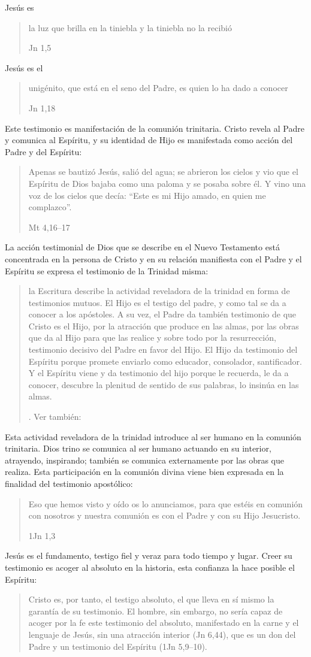Jesús es \blockquote[Jn 1,5]{la luz que brilla en la tiniebla y la tiniebla no la recibió}. Jesús es el \blockquote[Jn 1,18]{unigénito, que está en el seno del Padre, es quien lo ha dado a conocer}. Este testimonio es manifestación de la comunión trinitaria. Cristo revela al Padre y comunica al Espíritu, y su identidad de Hijo es manifestada como acción del Padre y del Espíritu: \blockquote[Mt 4,16--17]{Apenas se bautizó Jesús, salió del agua; se abrieron los cielos y vio que el Espíritu de Dios bajaba como una paloma y se posaba sobre él. Y vino una voz de los cielos que decía: \enquote{Este es mi Hijo amado, en quien me complazco}.}

La acción testimonial de Dios que se describe en el Nuevo Testamento está concentrada en la persona de Cristo y en su relación manifiesta con el Padre y el Espíritu se expresa el testimonio de la Trinidad misma: \blockquote[{\cite[410]{latourelle1999rev}}. Ver también: {\cite[131]{prades2015testimonio}}]{la Escritura describe la actividad reveladora de la trinidad en forma de testimonios mutuos. El Hijo es el testigo del padre, y como tal se da a conocer a los apóstoles. A su vez, el Padre da también testimonio de que Cristo es el Hijo, por la atracción que produce en las almas, por las obras que da al Hijo para que las realice y sobre todo por la resurrección, testimonio decisivo del Padre en favor del Hijo. El Hijo da testimonio del Espíritu porque promete enviarlo como educador, consolador, santificador. Y el Espíritu viene y da testimonio del hijo porque le recuerda, le da a conocer, descubre la plenitud de sentido de sus palabras, lo insinúa en las almas.} Esta actividad reveladora de la trinidad introduce al ser humano en la comunión trinitaria. Dios trino se comunica al ser humano actuando en su interior, atrayendo, inspirando; también se comunica externamente por las obras que realiza. Esta participación en la comunión divina viene bien expresada en la finalidad del testimonio apostólico: \blockquote[1Jn 1,3]{Eso que hemos visto y oído os lo anunciamos, para que estéis en comunión con nosotros y nuestra comunión es con el Padre y con su Hijo Jesucristo.}

Jesús es el fundamento, testigo fiel y veraz para todo tiempo y lugar.\autocite[Cf.][132]{prades2015testimonio} Creer su testimonio es acoger al absoluto en la historia, esta confianza la hace posible el Espíritu: \blockquote[{\cite{latourelle2000testimonio}}]{Cristo es, por tanto, el testigo absoluto, el que lleva en sí mismo la garantía de su testimonio. El hombre, sin embargo, no sería capaz de acoger por la fe este testimonio del absoluto, manifestado en la carne y el lenguaje de Jesús, sin una atracción interior (Jn 6,44), que es un don del Padre y un testimonio del Espíritu (1Jn 5,9--10).}

